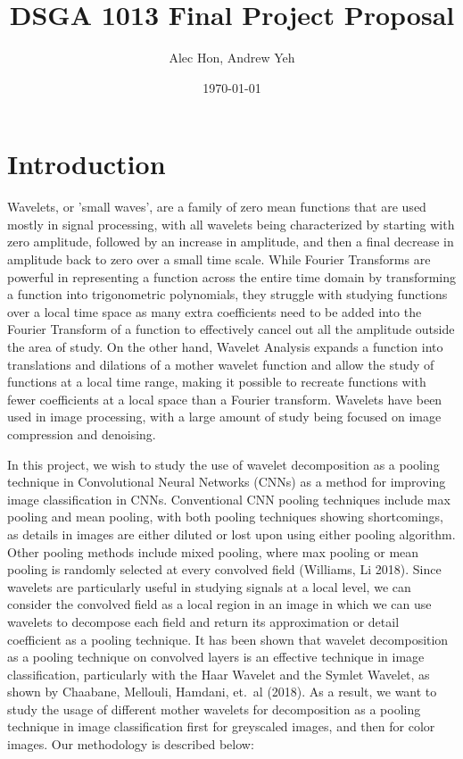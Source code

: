 \documentclass{article}
\begin{document}
\title{\large DSGA 1013 Final Project Proposal}
\author{\small Alec Hon, Andrew Yeh}
\date{\footnotesize \today}
\maketitle

\section{Introduction}

Wavelets, or 'small waves', are a family of zero mean functions that are used mostly in signal processing, with all wavelets being characterized by starting with zero amplitude, followed by an increase in amplitude, and then a final decrease in amplitude back to zero over a small time scale. While Fourier Transforms are powerful in representing a function across the entire time domain by transforming a function into trigonometric polynomials, they struggle with studying functions over a local time space as many extra coefficients need to be added into the Fourier Transform of a function to effectively cancel out all the amplitude outside the area of study. On the other hand, Wavelet Analysis expands a function into translations and dilations of a mother wavelet function and allow the study of functions at a local time range,  making it possible to recreate functions with fewer coefficients at a local space than a Fourier transform. Wavelets have been used in image processing, with a large amount of study being focused on image compression and denoising.  
 \newline
 
\noindent In this project, we wish to study the use of wavelet decomposition as a pooling technique in Convolutional Neural Networks (CNNs) as a method for improving image classification in CNNs. Conventional CNN pooling techniques include max pooling and mean pooling, with both pooling techniques showing shortcomings, as details in images are either diluted or lost upon using either pooling algorithm. Other pooling methods include mixed pooling, where max pooling or mean pooling is randomly selected at every convolved field (Williams, Li 2018). Since wavelets are particularly useful in studying signals at a local level, we can consider the convolved field as a local region in an image in which we can use wavelets to decompose each field and return its approximation or detail coefficient as a pooling technique. It has been shown that wavelet decomposition as a pooling technique on convolved layers is an effective technique in image classification, particularly with the Haar Wavelet and the Symlet Wavelet, as shown by Chaabane, Mellouli, Hamdani, et.\ al (2018). As a result, we want to study the usage of different mother wavelets for decomposition as a pooling technique in image classification first for greyscaled images, and then for color images. Our methodology is described below:
\end{document}

